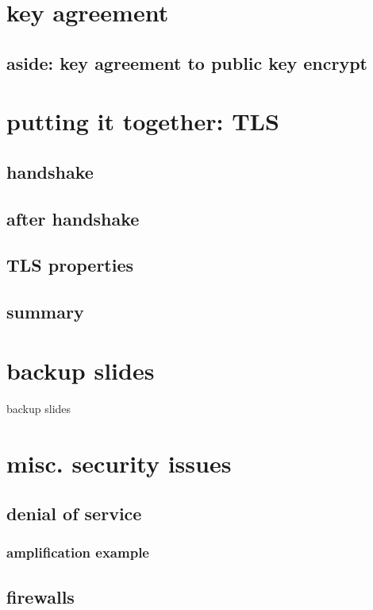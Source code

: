 \section{key agreement}



\subsection{aside: key agreement to public key encrypt}


\section{putting it together: TLS}

\subsection{handshake}


\subsection{after handshake}


\subsection{TLS properties}

\subsection{summary}




\section{backup slides}
\begin{frame}{backup slides}
\end{frame}

\section{misc. security issues}

\subsection{denial of service}


\subsubsection{amplification example}

\subsection{firewalls} %





